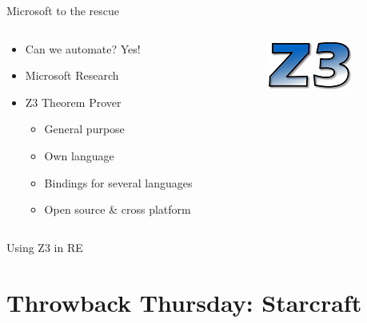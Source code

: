 \documentclass[10pt, compress]{beamer}
\begin{document}
\begin{frame}{Microsoft to the rescue}

	\begin{columns}
		\begin{column}{0.6\textwidth}

		\begin{itemize}
		\item Can we automate? Yes!
		\item Microsoft Research
		\item Z3 Theorem Prover
		\begin{itemize}
			\item General purpose
			\item Own language
			\item Bindings for several languages
			\item Open source \& cross platform
		\end{itemize}   
		\end{itemize}   
		
		\end{column}
		\begin{column}{0.4\textwidth}
			\includegraphics{images/z3-logo.png}
		\end{column}
	\end{columns}		

\end{frame}

\begin{frame}{Using Z3 in RE}
\section{Throwback Thursday: Starcraft}
\end{frame}
\end{document}
